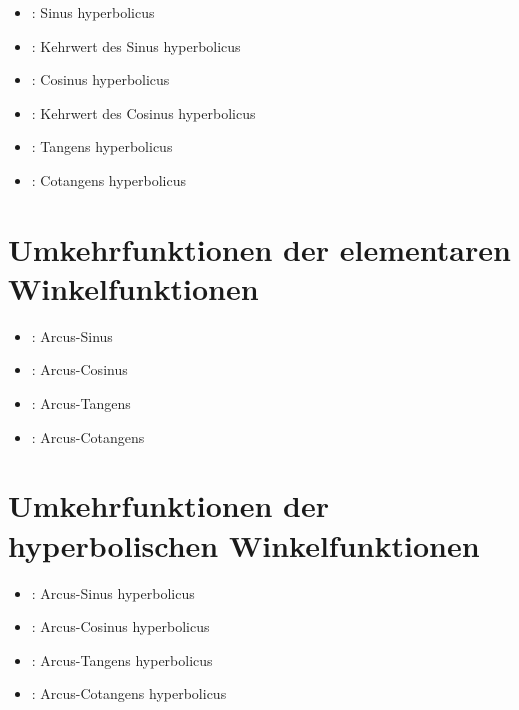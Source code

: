 \begin{itemize}

\item
{}:
Sinus hyperbolicus

\item
{}:
Kehrwert des Sinus hyperbolicus

\item
{}:
Cosinus hyperbolicus

\item
{}:
Kehrwert des Cosinus hyperbolicus

\item
{}:
Tangens hyperbolicus

\item
{}:
Cotangens hyperbolicus

\end{itemize}



\section{Umkehrfunktionen der elementaren Winkelfunktionen}

\begin{itemize}

\item
{}:
Arcus-Sinus

\item
{}:
Arcus-Cosinus

\item
{}:
Arcus-Tangens

\item
{}:
Arcus-Cotangens

\end{itemize}



\section{Umkehrfunktionen der hyperbolischen Winkelfunktionen}

\begin{itemize}

\item
{}:
Arcus-Sinus hyperbolicus

\item
{}:
Arcus-Cosinus hyperbolicus

\item
{}:
Arcus-Tangens hyperbolicus

\item
{}:
Arcus-Cotangens hyperbolicus

\end{itemize}



